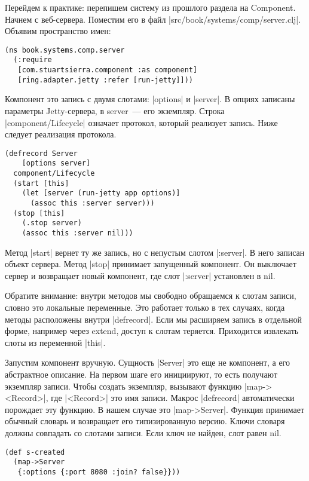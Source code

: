 Перейдем к практике: перепишем систему из прошлого раздела на Component. Начнем
с веб-сервера. Поместим его в файл \spverb|src/book/systems/comp/server.clj|. Объявим
пространство имен:

\begin{verbatim}
(ns book.systems.comp.server
  (:require
   [com.stuartsierra.component :as component]
   [ring.adapter.jetty :refer [run-jetty]]))
\end{verbatim}

Компонент это запись с двумя слотами: \spverb|options| и \spverb|server|. В опциях записаны
параметры Jetty-сервера, в server~--- его экземпляр. Строка \spverb|component/Lifecycle|
означает протокол, который реализует запись. Ниже следует реализация протокола.

\begin{verbatim}
(defrecord Server
    [options server]
  component/Lifecycle
  (start [this]
    (let [server (run-jetty app options)]
      (assoc this :server server)))
  (stop [this]
    (.stop server)
    (assoc this :server nil)))
\end{verbatim}

Метод \spverb|start| вернет ту же запись, но с непустым слотом \spverb|:server|. В него
записан объект сервера. Метод \spverb|stop| принимает запущенный компонент. Он
выключает сервер и возвращает новый компонент, где слот \spverb|:server| установлен в
nil.

Обратите внимание: внутри методов мы свободно обращаемся к слотам записи, словно
это локальные переменные. Это работает только в тех случаях, когда методы
расположены внутри \spverb|defrecord|. Если мы расширяем запись в отдельной форме,
например через extend, доступ к слотам теряется. Приходится извлекать слоты из
переменной \spverb|this|.

Запустим компонент вручную. Сущность \spverb|Server| это еще не компонент, а его
абстрактное описание. На первом шаге его инициируют, то есть получают экземпляр
записи. Чтобы создать экземпляр, вызывают функцию \spverb|map-><Record>|, где
\spverb|<Record>| это имя записи. Макрос \spverb|defrecord| автоматически порождает эту
функцию. В нашем случае это \spverb|map->Server|. Функция принимает обычный словарь и
возвращает его типизированную версию. Ключи словаря должны совпадать со слотами
записи. Если ключ не найден, слот равен nil.

\begin{verbatim}
(def s-created
  (map->Server
   {:options {:port 8080 :join? false}}))
\end{verbatim}

